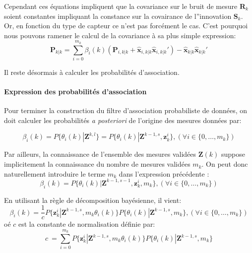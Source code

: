 \documentclass[10pt,french,a4paper]{report}
\begin{document}
Cependant ces équations impliquent que la covariance sur le bruit de mesure $\mathbf{R}_k$ soient constantes impliquant  la constance sur la covairance de l''innovation $\mathbf{S}_k$. Or, en fonction du type de capteur ce n'est pas forcément le cas. C'est pourquoi nous pouvons ramener le calcul de la covariance à sa plus simple expression:
	\begin{equation}
	 \mathbf{P}_{k|k}   =  \sum^{m_k}_{i=0}\beta_i(k) (\mathbf{P}_{i,k|k} + \hat{\mathbf{x}}_{i,k|k}\hat{\mathbf{x}}_{i,k|k}') -    \hat{\mathbf{x}}_{k|k}\hat{\mathbf{x}}_{k|k}'
	\end{equation}
	
	Il reste désormais à calculer les probabilités d'association.
	
	\paragraph{Expression des probabilités d'association}
	 Pour terminer la construction du filtre d'association probabiliste de données, on doit calculer les probabilités \textit{a posteriori} de l'origine des mesures données par:
	 
	 \begin{equation}
	\beta_i(k) = P\{\theta_i(k) | \mathbf{Z}^{k,l}\} = P\{\theta_i(k) | \mathbf{Z}^{k-1,s},\mathbf{z}_{k}^i \}, (\forall i \in \{0,\ldots,m_k\})
	\end{equation}
	
	Par ailleurs, la connaissance de l'ensemble des mesures validées $\mathbf{Z}(k) $ suppose implicitement la connaissance du nombre de mesures validées $m_k$. On peut donc naturellement introduire le terme $m_k$ dans l'expression précédente :
	 \begin{equation}
	\beta_i(k) = P\{\theta_i(k) | \mathbf{Z}^{k-1,s-1},\mathbf{z}_k^i,m_k \} , (\forall i \in \{0,\ldots,m_k\})
	\end{equation}
	
	En utilisant la règle de décomposition bayésienne, il vient:
	 \begin{equation}
	\beta_i(k) = \frac{1}{c} P\{\mathbf{z}_k^i| \mathbf{Z}^{k-1,s},m_k \theta_i(k) \} P\{\theta_i(k)| \mathbf{Z}^{k-1,s},m_k  \}, (\forall i \in \{0,\ldots,m_k\}) 
	\end{equation}
	oé $c$ est la constante de normalisation définie par:
	 \begin{equation}
	c \ = \sum_{i=0}^{m_k} P\{\mathbf{z}_k^i| \mathbf{Z}^{k-1,s},m_k \theta_i(k) \} P\{\theta_i(k)| \mathbf{Z}^{k-1,s},m_k  \} 
	\end{equation}
	
\end{document}
